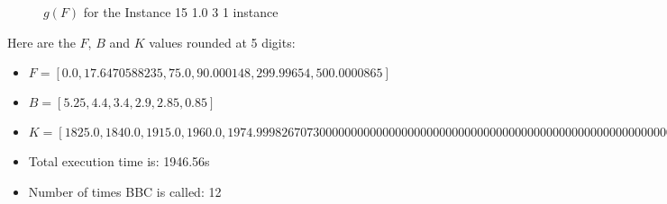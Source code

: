 \documentclass{article}
\begin{document}
\begin{figure}[ht!]
\begin{center}
    \end{center}
    \vspace*{-2eM}
    \caption{$g(F)$ for the Instance 15 1.0 3 1 instance}\label{fig:1}
    \end{figure}
    Here are the $F$, $B$ and $K$ values rounded at 5 digits:

\begin{itemize}
	\item  $F = [0.0,17.6470588235,75.0,90.000148,299.99654,500.0000865]$
 \item $B = [5.25,4.4,3.4,2.9,2.85,0.85]$
 \item  $K = [1825.0,1840.0,1915.0,1960.0,1974.999826707300000000000000000000000000000000000000000000000000000000000000005,2975.0]$\item Total execution time is: 1946.56s\item Number of times BBC is called: 12\end{itemize}
\end{document}
